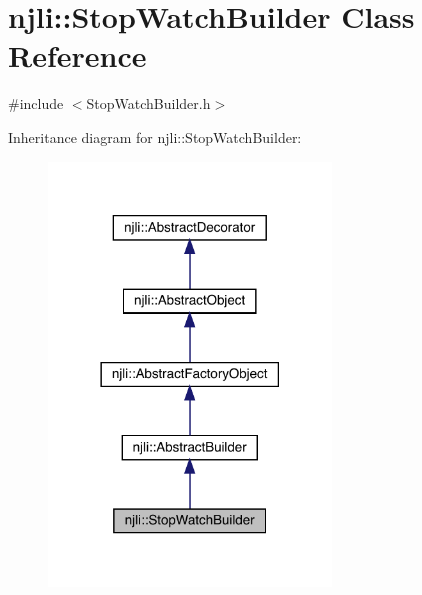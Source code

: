 \hypertarget{classnjli_1_1_stop_watch_builder}{}\section{njli\+:\+:Stop\+Watch\+Builder Class Reference}
\label{classnjli_1_1_stop_watch_builder}


{\ttfamily \#include $<$Stop\+Watch\+Builder.\+h$>$}



Inheritance diagram for njli\+:\+:Stop\+Watch\+Builder\+:\nopagebreak
\begin{figure}[H]
\begin{center}
\leavevmode
\includegraphics[width=213pt]{classnjli_1_1_stop_watch_builder__inherit__graph}
\end{center}
\end{figure}


